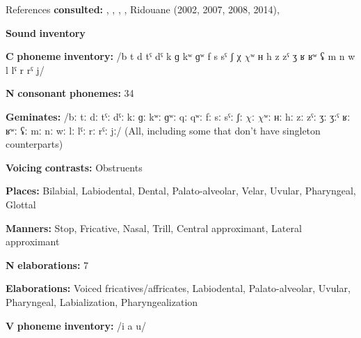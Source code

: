 \begin{styleBody}
References \textbf{consulted:} \citet{Coleman2001}, \citet{DellElmedlaoui2002}, \citet{GordonNafi2012}, \citet{LoualiPuech1999}, Ridouane (2002, 2007, 2008, 2014), \citet{RoettgerEtAl2015}
\end{styleBody}

\begin{styleBody}
\textbf{Sound} \textbf{inventory}
\end{styleBody}

\begin{styleBody}
\textbf{C} \textbf{phoneme} \textbf{inventory:} /b t d tˤ dˤ k ɡ kʷ ɡʷ f s sˤ ʃ χ $\chi ʷ$ ʜ h z zˤ ʒ ʁ ʁʷ ʢ m n w l lˤ r rˤ j/
\end{styleBody}

\begin{styleBody}
\textbf{N} \textbf{consonant} \textbf{phonemes:} 34
\end{styleBody}

\begin{styleBody}
\textbf{Geminates:} /bː tː dː tˤː dˤː kː ɡː kʷː ɡʷː qː qʷː fː sː sˤː ʃː $\chi ː$ $\chi ʷː$ ʜː hː zː zˤː ʒː ʒːˤ ʁː ʁʷː ʢː mː nː wː lː lˤː rː rˤː jː/ (All, including some that don’t have singleton counterparts)
\end{styleBody}

\begin{styleBody}
\textbf{Voicing} \textbf{contrasts:} Obstruents
\end{styleBody}

\begin{styleBody}
\textbf{Places:} Bilabial, Labiodental, Dental, Palato-alveolar, Velar, Uvular, Pharyngeal, Glottal
\end{styleBody}

\begin{styleBody}
\textbf{Manners:} Stop, Fricative, Nasal, Trill, Central approximant, Lateral approximant
\end{styleBody}

\begin{styleBody}
\textbf{N} \textbf{elaborations:} 7
\end{styleBody}

\begin{styleBody}
\textbf{Elaborations:} Voiced fricatives/affricates, Labiodental, Palato-alveolar, Uvular, Pharyngeal, Labialization, Pharyngealization
\end{styleBody}

\begin{styleBody}
\textbf{V} \textbf{phoneme} \textbf{inventory:} /i a u/
\end{styleBody}

